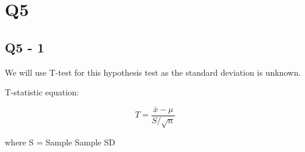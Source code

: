 \documentclass[11pt]{article}
\begin{document}
    \section{Q5}\label{q5}

\subsection{Q5 - 1}\label{q5---1}

We will use T-test for this hypothesis test as the standard deviation is
unknown.

T-statistic equation:

\begin{equation*} T = {\frac{\bar x - \mu} {S / \sqrt n}} \end{equation*}

where S = Sample Sample SD
\end{document}
